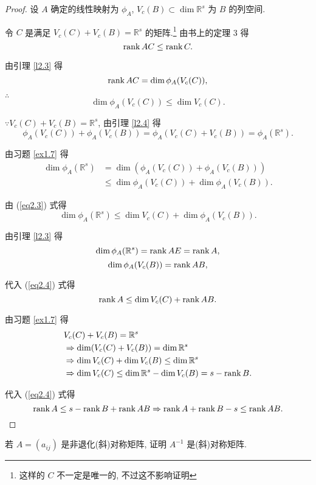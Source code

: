 \documentclass{ctexart}
\begin{document}
\begin{proof}
    设 $A$ 确定的线性映射为 $\phi_A$, $V_c(B)\subset\dim\mathbb{R}^s$ 为 $B$ 的列空间.

    令 $C$ 是满足 $V_c(C)+V_c(B)=\mathbb{R}^s$ 的矩阵.\footnote{这样的 $C$ 不一定是唯一的, 不过这不影响证明} 由书上的定理 3 得
    \[\operatorname{rank} AC\leq\operatorname{rank} C.\]

    由引理 \ref{l2.3} 得
    \[\operatorname{rank} AC=\dim\phi_A(V_c(C)),\]

    $\therefore$
    \begin{equation}\label{eq2.3}
        \dim\phi_A(V_c(C))\leq\dim V_c(C).
    \end{equation}

    $\because V_c(C)+V_c(B)=\mathbb{R}^s$, 由引理 \ref{l2.4} 得
    \[\phi_A(V_c(C))+\phi_A(V_c(B))=\phi_A(V_c(C)+V_c(B))=\phi_A(\mathbb{R}^s).\]

    由习题 \ref{ex1.7} 得
    \begin{align*}
        \dim\phi_A(\mathbb{R}^s) & =\dim(\phi_A(V_c(C))+\phi_A(V_c(B))) \\
        & \leq\dim\phi_A(V_c(C))+\dim\phi_A(V_c(B)).
    \end{align*}

    由 (\ref{eq2.3}) 式得
    \begin{equation}\label{eq2.4}
        \dim\phi_A(\mathbb{R}^s)\leq\dim V_c(C)+\dim\phi_A(V_c(B)).
    \end{equation}

    由引理 \ref{l2.3} 得
    \[\dim\phi_A(\mathbb{R}^s)=\operatorname{rank} AE=\operatorname{rank} A,\]
    \[\dim\phi_A(V_c(B))=\operatorname{rank} AB,\]

    代入 (\ref{eq2.4}) 式得
    \[\operatorname{rank} A\leq\dim V_c(C)+\operatorname{rank} AB.\]

    由习题 \ref{ex1.7} 得
    \begin{align*}
        & V_c(C)+V_c(B)=\mathbb{R}^s \\
        & \Rightarrow\dim (V_c(C)+V_c(B))=\dim\mathbb{R}^s \\
        & \Rightarrow\dim V_c(C)+\dim V_c(B)\leq\dim\mathbb{R}^s \\
        & \Rightarrow\dim V_c(C)\leq\dim\mathbb{R}^s-\dim V_c(B)=s-\operatorname{rank} B.
    \end{align*}

    代入 (\ref{eq2.4}) 式得
    \[\operatorname{rank} A\leq s-\operatorname{rank} B+\operatorname{rank} AB\Rightarrow\operatorname{rank} A+\operatorname{rank} B-s\leq\operatorname{rank} AB.\qedhere\]
\end{proof}
\setcounter{exercise}{10}
\begin{exercise}[有修改]
    若 $A=(a_{ij})$ 是非退化(斜)对称矩阵, 证明 $A^{-1}$ 是(斜)对称矩阵.
\end{exercise}
\end{document}
